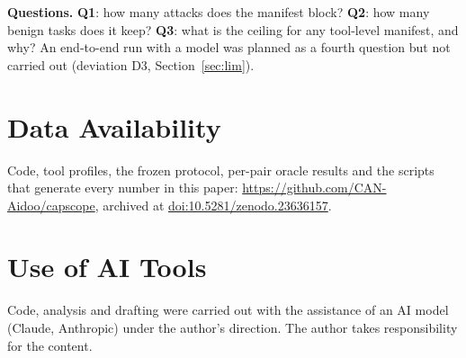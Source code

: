 \documentclass[10pt,twocolumn,letterpaper]{article}
\newcommand{\Q}[1]{\textbf{Q#1}}
\begin{document}
\textbf{Questions.} \Q1: how many attacks does the manifest block? \Q2: how many benign tasks does it keep? \Q3: what is
the ceiling for any tool-level manifest, and why? An end-to-end run with a model was planned as a fourth question
but not carried out (deviation D3, Section~\ref{sec:lim}).







\section*{Data Availability}
Code, tool profiles, the frozen protocol, per-pair oracle results and the scripts that generate every number in this
paper: \url{https://github.com/CAN-Aidoo/capscope}, archived at \href{https://doi.org/10.5281/zenodo.23636157}{doi:10.5281/zenodo.23636157}.

\section*{Use of AI Tools}
Code, analysis and drafting were carried out with the assistance of an AI model (Claude, Anthropic) under the author's
direction. The author takes responsibility for the content.


\end{document}
